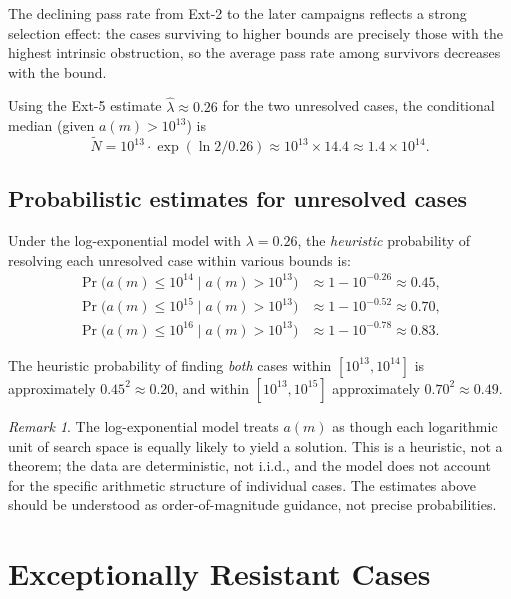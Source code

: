 \documentclass{amsart}
\theoremstyle{definition}
\theoremstyle{remark}
\newtheorem{remark}[theorem]{Remark}
\numberwithin{equation}{section}
\begin{document}
The declining pass rate from Ext-2 to the later campaigns
reflects a strong selection effect: the cases surviving to higher
bounds are precisely those with the highest intrinsic obstruction,
so the average pass rate among survivors decreases with the bound.

Using the Ext-5 estimate $\hat\lambda \approx 0.26$ for the
two unresolved cases, the conditional median (given $a(m) > 10^{13}$)
is
\[
\tilde{N} = 10^{13} \cdot \exp(\ln 2 / 0.26)
\approx 10^{13} \times 14.4
\approx 1.4 \times 10^{14}.
\]

\subsection{Probabilistic estimates for unresolved cases}

Under the log-exponential model with $\lambda = 0.26$,
the \emph{heuristic} probability of resolving each unresolved case
within various bounds is:
\begin{align*}
\Pr\bigl(a(m) \le 10^{14} \mid a(m) > 10^{13}\bigr)
  &\approx 1 - 10^{-0.26} \approx 0.45, \\
\Pr\bigl(a(m) \le 10^{15} \mid a(m) > 10^{13}\bigr)
  &\approx 1 - 10^{-0.52} \approx 0.70, \\
\Pr\bigl(a(m) \le 10^{16} \mid a(m) > 10^{13}\bigr)
  &\approx 1 - 10^{-0.78} \approx 0.83.
\end{align*}

The heuristic probability of finding \emph{both} cases within
$[10^{13}, 10^{14}]$ is approximately $0.45^2 \approx 0.20$,
and within $[10^{13}, 10^{15}]$ approximately
$0.70^2 \approx 0.49$.

\begin{remark}
The log-exponential model treats $a(m)$ as though each logarithmic
unit of search space is equally likely to yield a solution.  This is
a heuristic, not a theorem; the data are deterministic, not i.i.d.,
and the model does not account for the specific arithmetic structure
of individual cases.  The estimates above should be understood as
order-of-magnitude guidance, not precise probabilities.
\end{remark}

\section{Exceptionally Resistant Cases}
\label{sec:exceptional}
\end{document}
